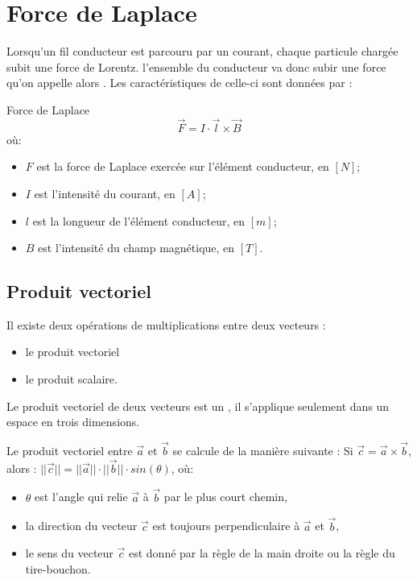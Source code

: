 \section{Force de Laplace}
Lorsqu'un fil conducteur est parcouru par un courant, chaque particule chargée subit une force de Lorentz. l'ensemble du conducteur va donc subir une force qu'on appelle alors . Les caractéristiques de celle-ci sont données par :
\begin{encadre_equation*}{Force de Laplace}
    \begin{equation}
        \vec{F}=I \cdot \vec{l} \times \vec{B}
    \end{equation} où:
    \begin{itemize}[label=\textbullet]
        \item \(F\) est la force de Laplace exercée sur l'élément conducteur, en \([N]\);
        \item \(I\) est l'intensité du courant, en \([A]\);
        \item \(l\) est la longueur de l'élément conducteur, en \([m]\);
        \item \(B\) est l'intensité du champ magnétique, en \([T]\).
    \end{itemize}
\end{encadre_equation*}


\subsection{Produit vectoriel}
Il existe deux opérations de multiplications entre deux vecteurs :
\begin{itemize} [label=\textbullet]
    \item le produit vectoriel
    \item le produit scalaire.
\end{itemize}

Le produit vectoriel de deux vecteurs est un , il s'applique seulement dans un espace en trois dimensions.

Le produit vectoriel entre  \(\vec{a}\) et \(\vec{b}\) se calcule de la manière suivante :
Si \(\vec{c}=\vec{a} \times \vec{b}\), alors :
\(||\vec{c}||= ||\vec{a}|| \cdot ||\vec{b}|| \cdot sin(\theta)\), où:
\begin{itemize}[label=\textbullet]
    \item \(\theta\) est l'angle qui relie \(\vec{a}\) à \(\vec{b}\) par le plus court chemin,
    \item la direction du vecteur \(\vec{c}\) est toujours perpendiculaire à \(\vec{a}\) et  \(\vec{b}\),
    \item le sens du vecteur \(\vec{c}\) est donné par la règle de la main droite ou la règle du tire-bouchon.
\end{itemize}

